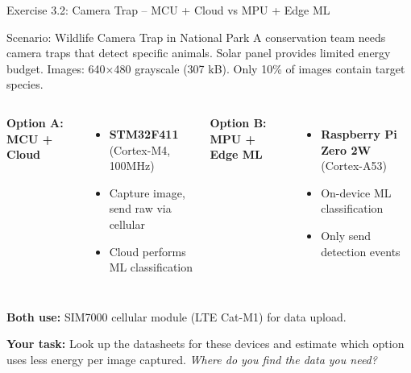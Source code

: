 \documentclass[aspectratio=169,11pt]{beamer}
\begin{document}
\begin{frame}{Exercise 3.2: Camera Trap -- MCU + Cloud vs MPU + Edge ML}
    \begin{block}{Scenario: Wildlife Camera Trap in National Park}
        A conservation team needs camera traps that detect specific animals. Solar panel provides limited energy budget. Images: 640$\times$480 grayscale (307 kB). Only 10\% of images contain target species.
        
        \vspace{0.2cm}
        \begin{columns}
            \textbf{Option A: MCU + Cloud}
            \begin{itemize}
                \item \textbf{STM32F411} (Cortex-M4, 100MHz)
                \item Capture image, send raw via cellular
                \item Cloud performs ML classification
            \end{itemize}
            
            \textbf{Option B: MPU + Edge ML}
            \begin{itemize}
                \item \textbf{Raspberry Pi Zero 2W} (Cortex-A53)
                \item On-device ML classification
                \item Only send detection events
            \end{itemize}
        \end{columns}
        
        \vspace{0.2cm}
        \textbf{Both use:} SIM7000 cellular module (LTE Cat-M1) for data upload.
    \end{block}
    
    \vspace{0.2cm}
    \textbf{Your task:} Look up the datasheets for these devices and estimate which option uses less energy per image captured. \textit{Where do you find the data you need?}
\end{frame}
\end{document}
